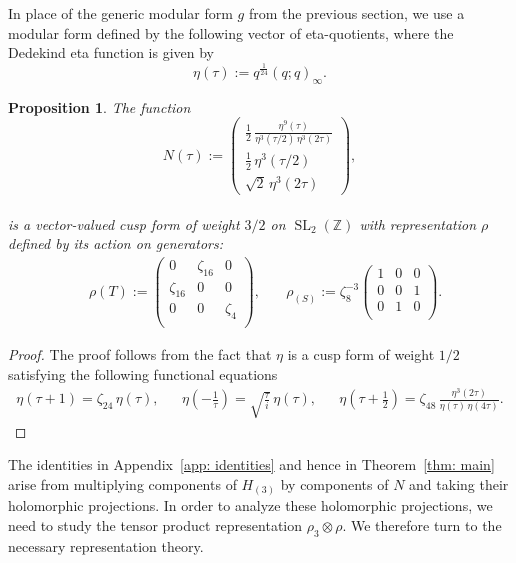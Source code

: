 \documentclass[11pt,reqno]{amsart}
\newtheorem{prp}[theorem]{Proposition}
\newcommand{\Z}{\mathbb{Z}}
\renewcommand{\=}{\;=\;}
\theoremstyle{myremark}
\begin{document}
In place of the generic modular form $g$ from the previous section, we use a modular form defined by the following vector of eta-quotients, where the Dedekind eta function is given by
\[
\eta(\tau):=q^{\frac1{24}}(q;q)_{\infty}.
\]
\begin{prp}
\label{prp:N}
The function 
\\
\begin{equation}\label{eq: H}
N(\tau):=
\begin{pmatrix}
\frac{1}{2}\,\frac{\eta^9(\tau)}{\eta^3(\tau/2)\,\eta^3(2\tau)}\\[0.2em]
\frac{1}{2}\,\eta^3(\tau/2)\\[0.2em]
\sqrt2\,\eta^3(2\tau)
\end{pmatrix},
\end{equation}
\\
is a vector-valued cusp form of weight $3/2$ on $\operatorname{SL}_2(\Z)$ with representation  $\rho$ defined by its action on generators:
\\
\begin{align*}
&
\rho(T):=
\begin{pmatrix}
0 & \zeta_{16} & 0 \\
\zeta_{16} & 0 & 0 \\
0 & 0 & \zeta_{4}  \\
\end{pmatrix},
&\quad
\rho_(S):= \zeta^{-3}_8
\begin{pmatrix}
1 & 0 & 0 \\
0 & 0 & 1 \\
0 & 1 & 0  \\
\end{pmatrix}.
\end{align*}
\end{prp}
\begin{proof}
The proof follows from the fact that $\eta$ is a cusp form of weight $1/2$ satisfying the following functional equations
\begin{align}\label{EtaTransformations}
\eta(\tau + 1)=\zeta_{24} \,\eta(\tau),
&&
\eta\left(-\frac{1}{\tau}\right)=\sqrt{\frac{\tau}{i}}\,\eta(\tau),
&&
\eta\left(\tau + \frac{1}{2}\right)=\zeta_{48}\,\frac{\eta^3(2\tau)}{\eta(\tau)\,\eta(4\tau)}.
\end{align}
\end{proof}

The identities in Appendix~\ref{app: identities} and hence in Theorem~\ref{thm: main} arise from multiplying components of $H_{(3)}$ by components of $N$ and taking their holomorphic projections. 
In order to analyze these holomorphic projections, we need to study the tensor product representation $\rho_3\otimes \rho$. 
We therefore turn to the necessary representation theory.
\end{document}
